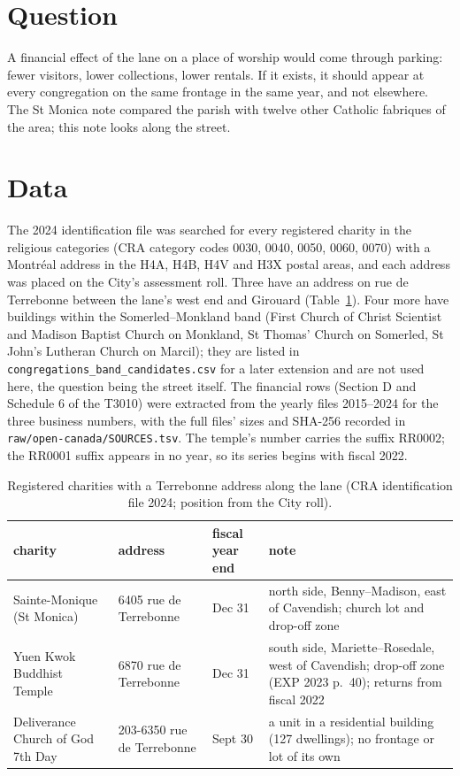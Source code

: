 \documentclass[11pt,a4paper]{article}
\begin{document}
\section*{Question}
A financial effect of the lane on a place of worship would come through parking: fewer visitors, lower collections, lower rentals. If it exists, it should appear at every congregation on the same frontage in the same year, and not elsewhere. The St Monica note compared the parish with twelve other Catholic fabriques of the area; this note looks along the street.

\section*{Data}
The 2024 identification file was searched for every registered charity in the religious categories (CRA category codes 0030, 0040, 0050, 0060, 0070) with a Montréal address in the H4A, H4B, H4V and H3X postal areas, and each address was placed on the City\textquoteright{}s assessment roll. Three have an address on rue de Terrebonne between the lane\textquoteright{}s west end and Girouard (Table~\ref{tab:set}). Four more have buildings within the Somerled--Monkland band (First Church of Christ Scientist and Madison Baptist Church on Monkland, St Thomas\textquoteright{} Church on Somerled, St John\textquoteright{}s Lutheran Church on Marcil); they are listed in \texttt{congregations\_band\_candidates.csv} for a later extension and are not used here, the question being the street itself. The financial rows (Section D and Schedule 6 of the T3010) were extracted from the yearly files 2015--2024 for the three business numbers, with the full files\textquoteright{} sizes and SHA-256 recorded in \texttt{raw/open-canada/SOURCES.tsv}. The temple\textquoteright{}s number carries the suffix RR0002; the RR0001 suffix appears in no year, so its series begins with fiscal 2022.
\begin{table}[htbp]\centering\small\caption{Registered charities with a Terrebonne address along the lane (CRA identification file 2024; position from the City roll).}\label{tab:set}
\begin{tabular}{@{}p{3.6cm}p{3.2cm}p{1.6cm}p{7.2cm}@{}}\toprule charity & address & fiscal year end & note\\ \midrule
Sainte-Monique (St Monica) & 6405 rue de Terrebonne & Dec 31 & north side, Benny--Madison, east of Cavendish; church lot and drop-off zone\\
Yuen Kwok Buddhist Temple & 6870 rue de Terrebonne & Dec 31 & south side, Mariette--Rosedale, west of Cavendish; drop-off zone (EXP 2023 p.~40); returns from fiscal 2022\\
Deliverance Church of God 7th Day & 203-6350 rue de Terrebonne & Sept 30 & a unit in a residential building (127 dwellings); no frontage or lot of its own\\
\bottomrule\end{tabular}\end{table}
\end{document}

